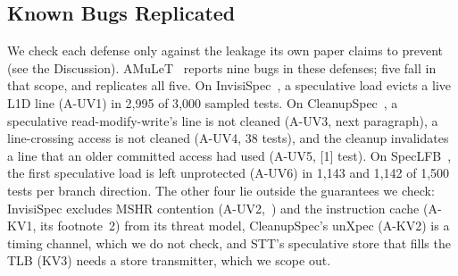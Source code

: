 \subsection{Known Bugs Replicated}
We check each defense only against the leakage its own paper claims to prevent (see the Discussion). AMuLeT~\cite{amulet} reports nine bugs in these defenses; five fall in that scope, and \toolname{} replicates all five. On InvisiSpec~\cite{yan2018invisispec}, a speculative load evicts a live L1D line (A-UV1) in 2{,}995 of 3{,}000 sampled tests. On CleanupSpec~\cite{saileshwar2019cleanupspec}, a speculative read-modify-write's line is not cleaned (A-UV3, next paragraph), a line-crossing access is not cleaned (A-UV4, 38 tests), and the cleanup invalidates a line that an older committed access had used (A-UV5, [1] test). On SpecLFB~\cite{cheng2024speclfb}, the first speculative load is left unprotected (A-UV6) in 1{,}143 and 1{,}142 of 1{,}500 tests per branch direction. The other four lie outside the guarantees we check: InvisiSpec excludes MSHR contention (A-UV2,~\cite[\S VII]{yan2018invisispec}) and the instruction cache (A-KV1, its footnote~2) from its threat model, CleanupSpec's unXpec (A-KV2) is a timing channel, which we do not check, and STT's speculative store that fills the TLB (KV3) needs a store transmitter, which we scope out.
\urgentbr
